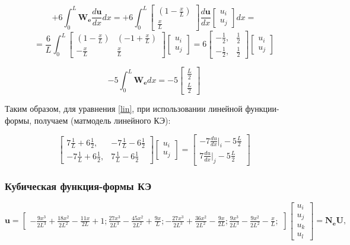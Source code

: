 $$
  +6 \int_0^L \mathbf{W_e} \frac{d \mathbf{u}}{dx} dx=  +6 \int_0^L
	\begin{bmatrix}
	(1-\frac{x}{L}) \\
	\frac{x}{L}
	\end{bmatrix}
\frac{d \mathbf{u}}{dx}
	\begin{bmatrix}
	u_i \\
	u_j
	\end{bmatrix}
dx
=
$$
$$
=
  \frac{6}{L} 
\int_0^L
\begin{bmatrix}
	(1-\frac{x}{L}) & (-1+\frac{x}{L})\\
	-\frac{x}{L} & \frac{x}{L}
\end{bmatrix}
\begin{bmatrix}
	u_i \\
	u_j
\end{bmatrix}
=
  6 
\begin{bmatrix}
-\frac{1}{2}, & \frac{1}{2} \\
-\frac{1}{2}, & \frac{1}{2}
\end{bmatrix}
\begin{bmatrix}
u_i \\
u_j
\end{bmatrix}
$$

$$-5\int_0^L \mathbf{W_e} d x= -5
\begin{bmatrix}
	\frac{L}{2} \\
	\frac{L}{2}
\end{bmatrix}
$$

Таким образом, для уравнения \ref{lin}, при использовании линейной функции-формы,  получаем (матмодель линейного КЭ):

$$
\begin{bmatrix}
	7\frac{1}{L}   +6  \frac{1}{2}, &   -7 \frac{1}{L}   -6  \frac{1}{2} \\
	  -7  \frac{1}{L}  +6  \frac{1}{2}, &  7\frac{1}{L}   -6  \frac{1}{2}
\end{bmatrix}
\begin{bmatrix}
	u_i \\
	u_j
\end{bmatrix}=
\begin{bmatrix}
	  -7 \frac{du}{dx}|_i  -5   \frac{L}{2}\\
	7\frac{du}{dx}|_j  -5   \frac{L}{2}
\end{bmatrix}
$$


\subsubsection{Кубическая функция-формы КЭ}
$$
\mathbf{u}=\begin{bmatrix}
-\frac{9x^3}{2L^3}+\frac{18x^2}{2L^2}-\frac{11x}{2L} + 1;
\frac{27x^3}{2L^3}-\frac{45x^2}{2L^2}+\frac{9x}{L};
-\frac{27x^3}{2L^3}+\frac{36x^2}{2L^2}-\frac{9x}{2L};
\frac{9x^3}{2L^3}-\frac{9x^2}{2L^2}-\frac{x}{L};
\end{bmatrix}
\begin{bmatrix}
u_i \\
u_j\\
u_k\\
u_l
\end{bmatrix}
=\mathbf{N_eU},
$$

